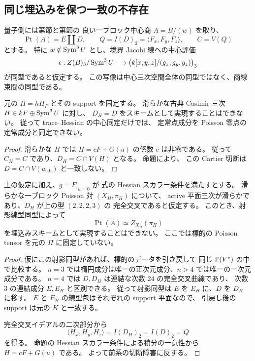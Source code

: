 \subsection{同じ埋込みを保つ一致の不存在}

量子側には第節と第節の
良い一ブロック中心商 $A=B/(w)$ を取り、
\[
 \operatorname{Pt}(A)=E\amalg D,\qquad
 Q=I(D)_2=\langle F_x,F_y,F_z\rangle,
 \qquad C=V(Q)
\]
とする。
特に $w\notin\operatorname{Sym}^3U$ とし、境界 Jacobi 線への中心評価
\[
 \epsilon:Z(B)_3/\operatorname{Sym}^3U\longrightarrow
       \bigl(k[x,y,z]/(g_x,g_y,g_z)\bigr)_3
\]
が同型であると仮定する。
この写像は中心三次空間全体の同型ではなく、商線束間の同型である。

\begin{corollary}
\label{ppz:cor:fixed-tensor}
元の $\Pi=h\Pi_F$ とその support を固定する。
滑らかな古典 Casimir 三次 $H\in kF\oplus\operatorname{Sym}^3U$ に対し、
$D_H=D$ をスキームとして実現することはできない。
従って trace--Hessian の中心同定だけでは、
定常点成分を Poisson 零点の定常成分と同定できない。
\end{corollary}
\begin{proof}
滑らかな $H$ では $H=cF+G(u)$ の係数 $c$ は非零である。
従って $C_H=C$ であり、$D_H=C\cap V(H)$ となる。
命題により、
この Cartier 切断は $D=C\cap V(w_{\mathrm{ab}})$ と一致しない。
\end{proof}

\begin{proposition}[良い一ブロック型の埋込み一致に対する障害]
\label{ppz:prop:embedded-obstruction}
上の仮定に加え、$g=F|_{u=0}$ が
式の Hessian スカラー条件を満たすとする。
滑らかな一ブロック Poisson 対 $(X_H,\pi_H)$ について、
active 平面三次が滑らかであり、$D_H$ が上の型 $(2,2,2,3)$ の
完全交叉であると仮定する。
このとき、射影線型同型によって
\[
 \operatorname{Pt}(A)\simeq Z_{X_H}(\pi_H)
\]
を埋込みスキームとして実現することはできない。
ここでは標的の Poisson tensor を元の $\Pi$ に固定していない。
\end{proposition}

\begin{proof}
仮にこの射影同型があれば、標的のデータを引き戻して
同じ $\mathbb P(V^*)$ の中で比較する。
$n=3$ では楕円成分は唯一の正次元成分、$n>4$ では唯一の一次元成分である。
$n=4$ では $D,D_H$ は連結な次数 $24$ の完全交叉曲線であり、
次数 $3$ の連結成分 $E,E_H$ と区別できる。
従って射影同型は $E$ を $E_H$ に、$D$ を $D_H$ に移す。
$E$ と $E_H$ の線型包はそれぞれの support 平面なので、
引戻し後の support は元の $K$ と一致する。

完全交叉イデアルの二次部分から
\[
 \langle H_x,H_y,H_z\rangle=I(D_H)_2=I(D)_2=Q
\]
を得る。
命題の Hessian スカラー条件による積分の一意性から
$H=cF+G(u)$ である。
よって前系の切断障害に反する。
\end{proof}

